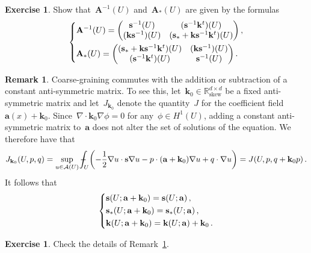 \documentclass[11pt,twoside]{article} %
\numberwithin{equation}{section}
\theoremstyle{definition}
\newtheorem{exercise}[theorem]{Exercise}
\newtheorem{remark}[theorem]{Remark}
\let\originalleft\left
\let\originalright\right
\renewcommand{\left}{\mathopen{}\mathclose\bgroup\originalleft}
\renewcommand{\right}{\aftergroup\egroup\originalright}
\newcommand*{\R}{\ensuremath{\mathbb{R}}}
\renewcommand{\skew}{\mathrm{skew}}
\newcommand{\s}{\mathbf{s}}
\renewcommand{\a}{\mathbf{a}}
\renewcommand{\k}{\mathbf{k}}
\def\Xint#1{\mathchoice
{\XXint\displaystyle\textstyle{#1}}%
{\XXint\textstyle\scriptstyle{#1}}%
{\XXint\scriptstyle\scriptscriptstyle{#1}}%
{\XXint\scriptscriptstyle\scriptscriptstyle{#1}}%
\!\int}
\def\XXint#1#2#3{{\setbox0=\hbox{$#1{#2#3}{\int}$}
\vcenter{\hbox{$#2#3$}}\kern-.5\wd0}}
\def\fint{\Xint-}
\newcommand{\A}{\mathcal{A}}
\newcommand{\bfA}{\mathbf{A}}
\begin{document}
\begin{exercise}
Show that~$\bfA^{-1}(U)$ and~$\bfA_*(U)$ are given by the formulas
\begin{equation}
\label{e.bigA.formulas.inv}
\left\{
\begin{aligned}
& 
\bfA^{-1}(U)
= 
\begin{pmatrix} 
\s^{-1}(U) 
& (\s^{-1}\k^t )(U) 
\\ (\k \s^{-1})(U) 
& (\s_* + \k \s^{-1}\k^t )(U) 
\end{pmatrix}\,,
\\ & 
\bfA_*(U)
= 
\begin{pmatrix} 
 (\s_* + \k \s^{-1}\k^t )(U) 
& (\k \s^{-1})(U) 
\\ (\s^{-1}\k^t )(U) 
& \s^{-1}(U)
\end{pmatrix}
\,.
\end{aligned}
\right.
\end{equation}
\end{exercise}


\begin{remark}
\label{r.commutes.with.skew}
Coarse-graining commutes with the addition or subtraction of a constant anti-symmetric matrix. To see this, let~$\k_0\in \R^{d\times d}_{\skew}$ be a fixed anti-symmetric matrix and let~$J_{\mathrm{\k_0}}$ denote the quantity~$J$ for the coefficient field~$\a(x)+\k_0$. Since~$\nabla \cdot \k_0 \nabla \phi = 0$ for any~$\phi \in H^1(U)$, adding a constant anti-symmetric matrix to~$\a$ does not alter the set of solutions of the equation. We therefore have that
\begin{equation}
\label{e.J.k.naught}
J_{\k_0}(U,p,q) 
=
\sup_{u \in  \A(U) }
\fint_{U} \biggl( - \frac12 \nabla u \cdot \s \nabla u - p \cdot ( \a + \k_0 ) \nabla u + q \cdot \nabla u \biggr) 
=
J(U,p,q + \k_0 p) 
\,.
\end{equation} 
It follows that 
\begin{equation}
\label{e.k0.commutes.with.J}
\left\{
\begin{aligned}
& \s(U;\a+\k_0) = \s(U;\a) \,, \\ 
& \s_*(U;\a+\k_0) = \s_*(U;\a)  \,, \\
& \k(U;\a+\k_0) = \k(U;\a) + \k_0\,.
\end{aligned}
\right.
\end{equation}
\end{remark}

\begin{exercise}
Check the details of Remark~\ref{r.commutes.with.skew}. 
\end{exercise}
\end{document}
